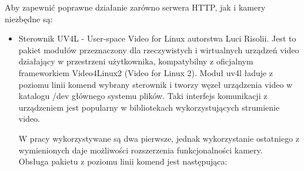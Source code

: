 \begin{description}
\item Aby zapewnić poprawne działanie zarówno serwera HTTP, jak i kamery niezbędne są:
	\begin{itemize}[noitemsep]
	\item Sterownik UV4L - User-space Video for Linux autorstwa Luci Risolii. Jest to pakiet modułów przeznaczony dla rzeczywistych i wirtualnych urządzeń video  działający w przestrzeni użytkownika, kompatybilny z oficjalnym frameworkiem Video4Linux2 (Video for Linux 2). Moduł uv4l ładuje z poziomu linii komend wybrany sterownik i tworzy węzeł urządzenia video w katalogu /dev głównego systemu plików. Taki interfejs komunikacji z urządzeniem jest popularny w bibliotekach wykorzystujących strumienie video.\\
W pracy wykorzystywane są dwa pierwsze, jednak wykorzystanie ostatniego z wymienionych daje możliwości rozszerzenia funkcjonalności kamery.\\
Obsługa pakietu z poziomu linii komend jest następująca:\\


\end{itemize}
\end{description}
